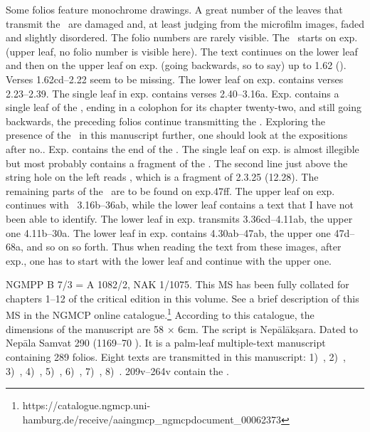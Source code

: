 Some folios feature monochrome drawings. A great number of the leaves that transmit the \VSS\ are damaged and, 
at least judging from the microfilm images, 
faded and slightly disordered. The folio numbers are
rarely visible. The \VSS\ starts on exp. 
(upper leaf, no folio number is visible here). 
The text continues on the lower leaf and then on the upper
leaf on exp. (going backwards, so to say) 
up to 1.62 (). 
Verses 1.62cd--2.22 seem to be missing. The lower leaf on
exp. contains verses 2.23--2.39. 
The single leaf in exp. contains
verses 2.40--3.16a. Exp. contains a single leaf of the
, ending in a colophon for its chapter
twenty-two, and still going backwards, the preceding folios continue
transmitting the 
. 
Exploring the presence of
the \VSS\ in this manuscript further, 
one should look at the expositions
after no.. Exp. contains the end of the
. The
single leaf on exp. 
is almost illegible but most probably contains a
fragment of the 
. 
The second line just above
the string hole on the left reads  , which is a fragment of
 2.3.25 (12.28). 
The remaining parts of the \VSS\
are to be found on exp.ff. 
The upper leaf on exp.\thinspace47 continues with
\VSS\ 3.16b--36ab, while the lower leaf contains a text that I have not
been able to identify. The lower leaf in exp.\thinspace48 transmits
3.36cd--4.11ab, the upper one 4.11b--30a. The lower leaf in 
exp. contains 4.30ab--47ab, 
the upper one 47d--68a, and so on so forth. Thus
when reading the text from these images, after exp., 
one has to start with the lower leaf and continue with the upper one.


NGMPP B 7/3 = A 1082/2, NAK 1/1075. This MS has been 
fully collated for chapters 1--12 of
the critical edition in this volume. See a brief description of this MS
in the NGMCP online catalogue.\footnote{https://catalogue.ngmcp.uni-hamburg.de/receive/aaingmcp\_ngmcpdocument\_00062373}
According to this catalogue, the dimensions of the manuscript are 
58 × 6cm. The script is Nepālākṣara. Dated to Nepāla Samvat 
290 (1169--70 \CE). It is a
palm-leaf multiple-text manuscript containing 289 folios. Eight texts
are transmitted in this manuscript: 
1)~,
2)~, 
3)~, 
4)~, 
5)~,
6)~,
7)~\Uums,
8)~. 
\Fols209v--264v contain the \VSS.

